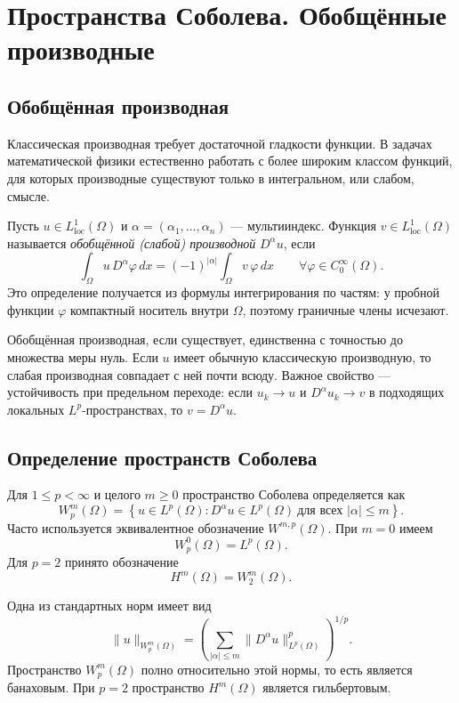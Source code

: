 \section{Пространства Соболева. Обобщённые производные}
\label{sec:sobolev-spaces}

\subsection{Обобщённая производная}

Классическая производная требует достаточной гладкости функции. В задачах
математической физики естественно работать с более широким классом функций,
для которых производные существуют только в интегральном, или слабом, смысле.

Пусть $u\in L^1_{\mathrm{loc}}(\Omega)$ и $\alpha=(\alpha_1,\ldots,\alpha_n)$
--- мультииндекс. Функция $v\in L^1_{\mathrm{loc}}(\Omega)$ называется
\emph{обобщённой (слабой) производной} $D^\alpha u$, если
\[
    \int_\Omega u\,D^\alpha\varphi\,dx
    =(-1)^{|\alpha|}\int_\Omega v\,\varphi\,dx
    \qquad
    \forall\varphi\in C_0^\infty(\Omega).
\]
Это определение получается из формулы интегрирования по частям: у пробной
функции $\varphi$ компактный носитель внутри $\Omega$, поэтому граничные члены
исчезают.

Обобщённая производная, если существует, единственна с точностью до множества
меры нуль. Если $u$ имеет обычную классическую производную, то слабая
производная совпадает с ней почти всюду. Важное свойство --- устойчивость при
предельном переходе: если $u_k\to u$ и $D^\alpha u_k\to v$ в подходящих
локальных $L^p$-пространствах, то $v=D^\alpha u$.

\subsection{Определение пространств Соболева}

Для $1\leq p<\infty$ и целого $m\geq0$ пространство Соболева определяется как
\[
    W_p^m(\Omega)=
    \left\{u\in L^p(\Omega):
      D^\alpha u\in L^p(\Omega)
      \ \text{для всех }|\alpha|\leq m\right\}.
\]
Часто используется эквивалентное обозначение $W^{m,p}(\Omega)$. При $m=0$
имеем
\[
    W_p^0(\Omega)=L^p(\Omega).
\]
Для $p=2$ принято обозначение
\[
    H^m(\Omega)=W_2^m(\Omega).
\]

Одна из стандартных норм имеет вид
\[
    \|u\|_{W_p^m(\Omega)}
    =\left(
        \sum_{|\alpha|\leq m}
        \|D^\alpha u\|_{L^p(\Omega)}^p
      \right)^{1/p}.
\]
Пространство $W_p^m(\Omega)$ полно относительно этой нормы, то есть является
банаховым. При $p=2$ пространство $H^m(\Omega)$ является гильбертовым.

